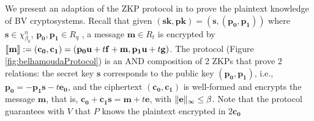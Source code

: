 We present an adaption of the ZKP protocol in \cite{benhamouda2014better} to
prove the plaintext knowledge of BV cryptosystems. Recall that given
$\mathbf{(sk,pk) = (s,(p_0,p_1))}$ where $\mathbf{s} \in \chi_{\beta_0}^n$,
$\mathbf{p_0,p_1} \in R_q$ , a message $\mathbf{m} \in R_t$ is encrypted by
$\left\llbracket\mathbf{m}\right\rrbracket := \mathbf{(c_0, c_1)} = (\mathbf{p_0u} + t\mathbf{f + m,
  p_1u} + t\mathbf{g)}$. The protocol (Figure \ref{fig:belhamoudaProtocol}) is
an AND composition of 2 ZKPs that prove 2 relations: the secret key $\mathbf{s}$
corresponds to the public key $\mathbf{(p_0,p_1)}$, i.e.,
$\mathbf{p_0 = -p_1s} - t\mathbf{e_0}$, and the ciphertext $\mathbf{(c_0,c_1)}$
is well-formed and encrypts the message $\mathbf{m}$, that is,
$\mathbf{c_0 + c_1s} = \mathbf{m} + t\mathbf{e}$, with
$\Vert \mathbf{e} \Vert_{\infty} \leq \beta$. Note that the protocol guarantees with $V$
that $P$ knows the plaintext encrypted in $2\mathbf{c_0}$

